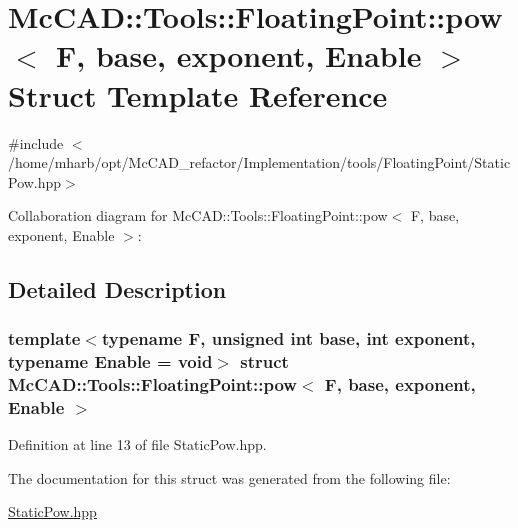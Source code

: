 \hypertarget{structMcCAD_1_1Tools_1_1FloatingPoint_1_1pow}{}\section{Mc\+C\+AD\+:\+:Tools\+:\+:Floating\+Point\+:\+:pow$<$ F, base, exponent, Enable $>$ Struct Template Reference}
\label{structMcCAD_1_1Tools_1_1FloatingPoint_1_1pow}


{\ttfamily \#include $<$/home/mharb/opt/\+Mc\+C\+A\+D\+\_\+refactor/\+Implementation/tools/\+Floating\+Point/\+Static\+Pow.\+hpp$>$}



Collaboration diagram for Mc\+C\+AD\+:\+:Tools\+:\+:Floating\+Point\+:\+:pow$<$ F, base, exponent, Enable $>$\+:


\subsection{Detailed Description}
\subsubsection*{template$<$typename F, unsigned int base, int exponent, typename Enable = void$>$\newline
struct Mc\+C\+A\+D\+::\+Tools\+::\+Floating\+Point\+::pow$<$ F, base, exponent, Enable $>$}



Definition at line 13 of file Static\+Pow.\+hpp.



The documentation for this struct was generated from the following file\+:\begin{DoxyCompactItemize}
\item 
\hyperlink{StaticPow_8hpp}{Static\+Pow.\+hpp}\end{DoxyCompactItemize}
